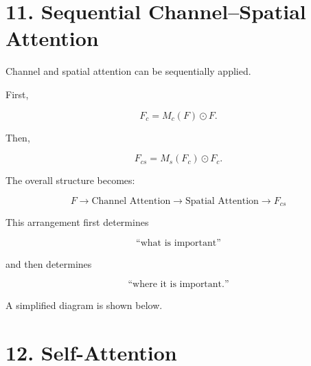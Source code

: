 \documentclass[10pt]{article}
\begin{document}
\section*{11. Sequential Channel--Spatial Attention}

Channel and spatial attention can be sequentially applied.

First,

\[
F_c
=
M_c(F)\odot F.
\]

Then,

\[
F_{cs}
=
M_s(F_c)\odot F_c.
\]

The overall structure becomes:

\[
\boxed{
F
\rightarrow
\text{Channel Attention}
\rightarrow
\text{Spatial Attention}
\rightarrow
F_{cs}
}
\]

This arrangement first determines

\[
\text{``what is important''}
\]

and then determines

\[
\text{``where it is important.''}
\]

A simplified diagram is shown below.

\begin{center}


\end{center}

\section*{12. Self-Attention}
\end{document}
